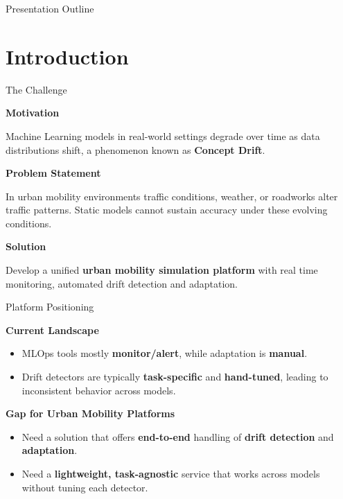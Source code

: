 \documentclass[aspectratio=169,11pt]{beamer}
\begin{document}
\begin{frame}[plain]{Presentation Outline}
    \tableofcontents
\end{frame}

\section{Introduction}

\begin{frame}{The Challenge}

    \textbf{Motivation}

    Machine Learning models in real-world settings degrade over time as data distributions shift, a phenomenon known as \textbf{Concept Drift}.

    \bigskip
    \textbf{Problem Statement}

    In urban mobility environments traffic conditions, weather, or roadworks alter traffic patterns.
    Static models cannot sustain accuracy under these evolving conditions.

    \bigskip
    \textbf{Solution}

    Develop a unified \textbf{urban mobility simulation platform} with real time monitoring, automated drift detection and adaptation.

\end{frame}

\begin{frame}{Platform Positioning}

    \textbf{Current Landscape}

    \begin{itemize}
        \item MLOps tools mostly \textbf{monitor/alert}, while adaptation is \textbf{manual}.
        \item Drift detectors are typically \textbf{task-specific} and \textbf{hand-tuned}, leading to inconsistent behavior across models.
    \end{itemize}

    \bigskip

    \textbf{Gap for Urban Mobility Platforms}

    \begin{itemize}
        \item Need a solution that offers \textbf{end-to-end} handling of \textbf{drift detection} and \textbf{adaptation}.
        \item Need a \textbf{lightweight, task-agnostic} service that works across models without tuning each detector.
    \end{itemize}

\end{frame}
\end{document}
